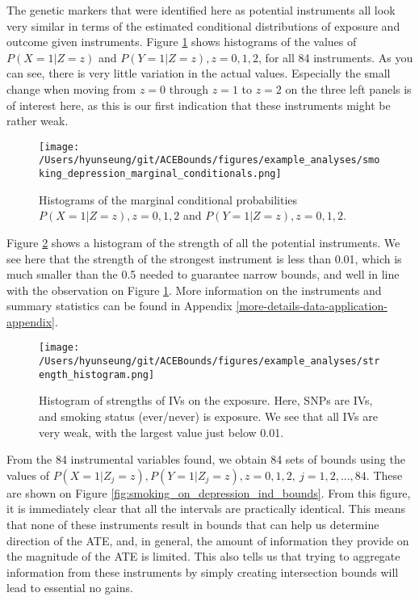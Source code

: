 \documentclass[
]{article}
\theoremstyle{plain}
\begin{document}
The genetic markers that were identified here as potential instruments all look very similar in terms of the estimated conditional distributions of exposure and outcome given instruments. Figure \ref{fig:smoking_on_depression_marginals} shows histograms of the values of \(P(X = 1|Z = z)\) and \(P(Y = 1|Z = z), z = 0,1,2\), for all 84 instruments. As you can see, there is very little variation in the actual values. Especially the small change when moving from \(z = 0\) through \(z = 1\) to \(z = 2\) on the three left panels is of interest here, as this is our first indication that these instruments might be rather weak.

\begin{figure}[H]
  \texttt{[image: /Users/hyunseung/git/ACEBounds/figures/example\_analyses/smoking\_depression\_marginal\_conditionals.png]}
  \caption{Histograms of the marginal conditional probabilities $P(X = 1 | Z = z), z = 0,1,2$ and $P(Y = 1 | Z = z), z=0,1,2$.}
  \label{fig:smoking_on_depression_marginals}
\end{figure}

Figure \ref{fig:strength_histogram} shows a histogram of the strength of all the potential instruments. We see here that the strength of the strongest instrument is less than 0.01, which is much smaller than the 0.5 needed to guarantee narrow bounds, and well in line with the observation on Figure \ref{fig:smoking_on_depression_marginals}. More information on the instruments and summary statistics can be found in Appendix \ref{more-details-data-application-appendix}.

\begin{figure}[H]
  \center
  \texttt{[image: /Users/hyunseung/git/ACEBounds/figures/example\_analyses/strength\_histogram.png]}
  \caption{Histogram of strengths of IVs on the exposure. Here, SNPs are IVs, and smoking status (ever/never) is exposure. We see that all IVs are very weak, with the largest value just below 0.01.}
  \label{fig:strength_histogram}
\end{figure}

From the 84 instrumental variables found, we obtain 84 sets of bounds using the values of \(P(X = 1 | Z_j = z), P(Y = 1 | Z_j = z), z = 0,1,2,\ j=1,2,...,84\). These are shown on Figure \ref{fig:smoking_on_depression_ind_bounds}. From this figure, it is immediately clear that all the intervals are practically identical. This means that none of these instruments result in bounds that can help us determine direction of the ATE, and, in general, the amount of information they provide on the magnitude of the ATE is limited. This also tells us that trying to aggregate information from these instruments by simply creating intersection bounds will lead to essential no gains.
\end{document}
